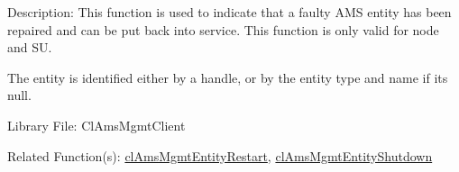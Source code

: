 \begin{Desc}
\item[Description:]This function is used to indicate that a faulty AMS entity has been repaired and can be put back into service. This function is only valid for node and SU. \par
 \par
 The entity is identified either by a handle, or by the entity type and name if its null.\end{Desc}
\begin{Desc}
\item[Library File:]Cl\-Ams\-Mgmt\-Client\end{Desc}
\begin{Desc}
\item[Related Function(s):]\hyperlink{pageams114}{cl\-Ams\-Mgmt\-Entity\-Restart}, \hyperlink{pageams113}{cl\-Ams\-Mgmt\-Entity\-Shutdown} \end{Desc}

\newpage
